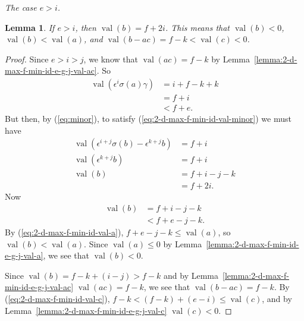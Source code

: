 \documentclass{amsart}
\newtheorem{lemma}{Lemma}[subsection]
\theoremstyle{definition}
\def\e{\epsilon}
\def\val{\mathop{\mathrm{val}}}
\def\s{\sigma}
\newcommand\subsubsubsection[1]{\vspace{0.5em}\begin{paragraph}{}\noindent \normalfont\large\itshape #1. \end{paragraph}\vspace{0.5em}}
\begin{document}
  \subsubsubsection{The case $e > i$}

  \begin{lemma}
    \label{lemma:2-d-max-f-min-id-e-g-i-val-b}
    If $e > i$, then $\val(b) = f + 2i$.  This means that $\val(b) < 0$,
    $\val(b) < \val(a)$, and $\val(b-ac) = f-k < \val(c) < 0$.
  \end{lemma}
  \begin{proof}
    Since $e > i > j$, we know that $\val(ac) = f - k$ by
    Lemma~\ref{lemma:2-d-max-f-min-id-e-g-j-val-ac}.  So
    \begin{align*}
      \val(\e^i\s(a)\gamma) &= i + f - k + k \\
      &= f + i \\
      &< f + e.
    \end{align*}
    But then, by (\ref{eq:minor}), to satisfy
    (\ref{eq:2-d-max-f-min-id-val-minor}) we must have
    \begin{align*}
      \val(\e^{i+j}\s(b) - \e^{k+j}b) &= f + i \\
      \val(\e^{k+j}b) &= f + i\\
      \val(b) &= f + i - j - k \\
              &= f + 2i.
    \end{align*}
    Now \begin{align*}
      \val(b) &= f + i - j - k \\
              &< f + e - j - k.
    \end{align*}
    By (\ref{eq:2-d-max-f-min-id-val-a}), $f + e - j - k \le \val(a)$, so
    $\val(b) < \val(a)$.  Since $\val(a) \le 0$ by
    Lemma~\ref{lemma:2-d-max-f-min-id-e-g-j-val-a}, we see that $\val(b) < 0$.
    
    Since $\val(b) = f - k + (i - j) > f-k$ and by
    Lemma~\ref{lemma:2-d-max-f-min-id-e-g-j-val-ac} $\val(ac) = f - k$, we see
    that $\val(b-ac) = f-k$.  By (\ref{eq:2-d-max-f-min-id-val-c}), $f-k < (f -
    k) + (e-i) \le \val(c)$, and by
    Lemma~\ref{lemma:2-d-max-f-min-id-e-g-j-val-c} $\val(c) < 0$.
  \end{proof}
\end{document}
